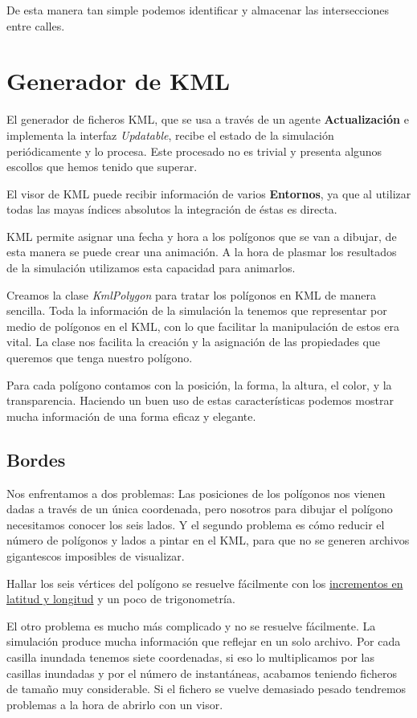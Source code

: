 De esta manera tan simple podemos identificar y almacenar las intersecciones
entre calles.

\section*{Generador de KML}

El generador de ficheros KML, que se usa a través de un agente {\bf
Actualización} e implementa la interfaz {\em Updatable}, recibe el estado de la
simulación periódicamente y lo procesa. Este procesado no es trivial y presenta
algunos escollos que hemos tenido que superar.

El visor de KML puede recibir información de varios {\bf Entornos}, ya que al
utilizar todas las mayas índices absolutos la integración de éstas es directa.

KML permite asignar una fecha y hora a los polígonos que se van a dibujar, de
esta manera se puede crear una animación. A la hora de plasmar los resultados
de la simulación utilizamos esta capacidad para animarlos.

Creamos la clase {\em KmlPolygon} para tratar los polígonos en KML de manera
sencilla. Toda la información de la simulación la tenemos que representar por
medio de polígonos en el KML, con lo que facilitar la manipulación de estos era
vital. La clase nos facilita la creación y la asignación de las propiedades que
queremos que tenga nuestro polígono.

Para cada polígono contamos con la posición, la forma, la altura, el color, y la
transparencia. Haciendo un buen uso de estas características podemos mostrar
mucha información de una forma eficaz y elegante.

\subsection*{Bordes}

Nos enfrentamos a dos problemas: Las posiciones de los polígonos nos vienen
dadas a través de un única coordenada, pero nosotros para dibujar el polígono
necesitamos conocer los seis lados. Y el segundo problema es cómo reducir el
número de polígonos y lados a pintar en el KML, para que no se generen archivos
gigantescos imposibles de visualizar.

Hallar los seis vértices del polígono se resuelve fácilmente con los
\hyperref[incrementos]{incrementos en latitud y longitud} y un poco de
trigonometría.

El otro problema es mucho más complicado y no se resuelve fácilmente. La
simulación produce mucha información que reflejar en un solo archivo. Por
cada casilla inundada tenemos siete coordenadas, si eso lo multiplicamos por las
casillas inundadas y por el número de instantáneas, acabamos teniendo ficheros
de tamaño muy considerable. Si el fichero se vuelve demasiado pesado tendremos
problemas a la hora de abrirlo con un visor.

